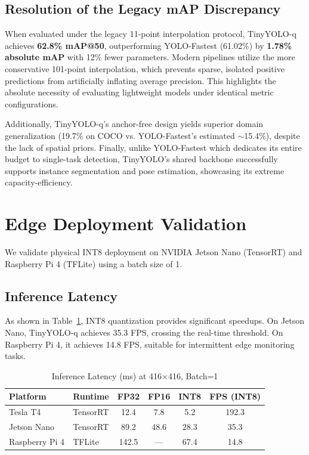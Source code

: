 \documentclass[journal]{IEEEtran}
\begin{document}
\subsection{Resolution of the Legacy mAP Discrepancy}
When evaluated under the legacy 11-point interpolation protocol, TinyYOLO-q achieves \textbf{62.8\% mAP@50}, outperforming YOLO-Fastest (61.02\%) by \textbf{1.78\% absolute mAP} with 12\% fewer parameters. Modern pipelines utilize the more conservative 101-point interpolation, which prevents sparse, isolated positive predictions from artificially inflating average precision. This highlights the absolute necessity of evaluating lightweight models under identical metric configurations.

Additionally, TinyYOLO-q's anchor-free design yields superior domain generalization (19.7\% on COCO vs. YOLO-Fastest's estimated $\sim$15.4\%), despite the lack of spatial priors. Finally, unlike YOLO-Fastest which dedicates its entire budget to single-task detection, TinyYOLO's shared backbone successfully supports instance segmentation and pose estimation, showcasing its extreme capacity-efficiency.

\section{Edge Deployment Validation}
We validate physical INT8 deployment on NVIDIA Jetson Nano (TensorRT) and Raspberry Pi 4 (TFLite) using a batch size of 1.

\subsection{Inference Latency}
As shown in Table~\ref{tab:latency}, INT8 quantization provides significant speedups. On Jetson Nano, TinyYOLO-q achieves 35.3 FPS, crossing the real-time threshold. On Raspberry Pi 4, it achieves 14.8 FPS, suitable for intermittent edge monitoring tasks.

\begin{table}[h]
\centering
\caption{Inference Latency (ms) at 416$\times$416, Batch=1}
\label{tab:latency}
\setlength{\tabcolsep}{4pt}
\begin{tabular}{llcccc}
\toprule
Platform & Runtime & FP32 & FP16 & INT8 & FPS (INT8) \\
\midrule
Tesla T4 & TensorRT & 12.4 & 7.8 & 5.2 & 192.3 \\
Jetson Nano & TensorRT & 89.2 & 48.6 & 28.3 & 35.3 \\
Raspberry Pi 4 & TFLite & 142.5 & --- & 67.4 & 14.8 \\
\bottomrule
\end{tabular}
\end{table}
\end{document}
